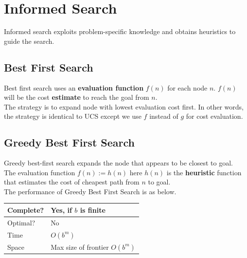 \documentclass[12pt]{article}
\theoremstyle{definition}
\begin{document}
\section{Informed Search}
Informed search exploits problem-specific knowledge and obtains heuristics to guide the search.
\subsection{Best First Search}
Best first search uses an \textbf{evaluation function} $f(n)$ for each node $n$. $f(n)$ will be the cost \textbf{estimate} to reach the goal from $n$.\\
The strategy is to expand node with lowest evaluation cost first. In other words, the strategy is identical to UCS except we use $f$ instead of $g$ for cost evaluation.
\subsection{Greedy Best First Search}
Greedy best-first search expands the node that appears to be closest to goal. \\
The evaluation function $f(n):=h(n)$ here $h(n)$ is the \textbf{heuristic} function that estimates the cost of cheapest path from $n$ to goal.\\
The performance of Greedy Best First Search is as below.
\begin{table}[h]
\centering
\begin{tabular}{|l|l|}
\hline
Complete?&Yes, if $b$ is finite\\\hline
Optimal?&No\\\hline
Time&$O(b^m)$\\\hline
Space& Max size of frontier $O(b^m)$\\\hline
\end{tabular}
\end{table}
\end{document}
